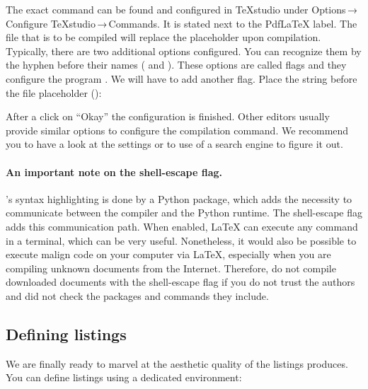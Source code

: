 
\noindent The exact command can be found and configured in \TeX{}studio under Options\,→\,Configure \TeX{}studio\,→\,Commands.
It is stated next to the Pdf\LaTeX{} label.
The file that is to be compiled will replace the placeholder  upon compilation.
Typically, there are two additional options configured.
You can recognize them by the hyphen before their names ( and ).
These options are called flags and they configure the program . 
We will have to add another flag.
Place the string  before the file placeholder ():


\noindent After a click on \enquote{Okay} the configuration is finished.
Other editors usually provide similar options to configure the compilation command.
We recommend you to have a look at the settings or to use of a search engine to figure it out.

\paragraph{An important note on the shell-escape flag.} 's syntax highlighting is done by a Python package, which adds the necessity to communicate between the compiler and the Python runtime.
The shell-escape flag adds this communication path.
When enabled, \LaTeX{} can execute any command in a terminal, which can be very useful.
Nonetheless, it would also be possible to execute malign code on your computer via \LaTeX{}, especially when you are compiling unknown documents from the Internet.
Therefore, do not compile downloaded documents with the shell-escape flag if you do not trust the authors and did not check the packages and commands they include.

\subsection{Defining listings}
We are finally ready to marvel at the aesthetic quality of the listings  produces.
You can define listings using a dedicated environment:


